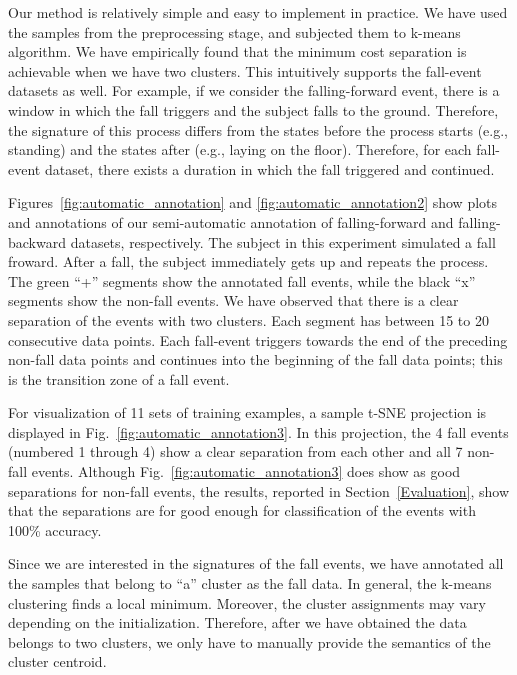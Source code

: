 \documentclass[]{IEEEtran}
\begin{document}
Our method is relatively simple and easy to implement in practice. We have used
the samples from the preprocessing stage, and subjected them to k-means
algorithm. We have empirically found that the minimum cost separation is
achievable when we have two clusters. This intuitively supports the fall-event
datasets as well. For example, if we consider the falling-forward event, there
is a window in which the fall triggers and the subject falls to the ground.
Therefore, the signature of this process differs from the states before the
process starts (e.g., standing) and the states after (e.g., laying on the
floor). Therefore, for each fall-event dataset, there exists a duration in which the fall
triggered and continued.

Figures~\ref{fig:automatic_annotation} and \ref{fig:automatic_annotation2} show
plots and annotations of our semi-automatic annotation of falling-forward  and
falling-backward datasets, respectively. The subject in this experiment
simulated a fall froward. After a fall, the subject immediately gets up and
repeats the process. The green ``+'' segments show the annotated fall events,
while the black ``x'' segments show the non-fall events. We have observed that
there is a clear separation of the events with two clusters. Each segment has
between 15 to 20 consecutive data points.
Each fall-event triggers towards the end of the preceding non-fall data points
and continues into the beginning of the fall data points; this is the
transition zone of a fall event.

\par For visualization of 11 sets of training examples, a sample t-SNE
projection  is displayed in Fig.~\ref{fig:automatic_annotation3}. In this
projection, the 4 fall events (numbered 1 through 4) show a clear separation
from each other and all 7 non-fall events. Although
Fig.~\ref{fig:automatic_annotation3} does show as good separations for non-fall
events, the results, reported in Section~\ref{Evaluation}, show that the
separations are for good enough for classification of the events with 100\%
accuracy.

Since we are interested in the signatures of the fall events, we have annotated
all the samples  that belong to ``a'' cluster as the fall data. In general, the
k-means clustering finds a local minimum. Moreover, the cluster assignments may
vary depending on the initialization. Therefore, after we have obtained the
data belongs to two clusters, we only have to manually provide the semantics of
the cluster centroid. 
\end{document}
